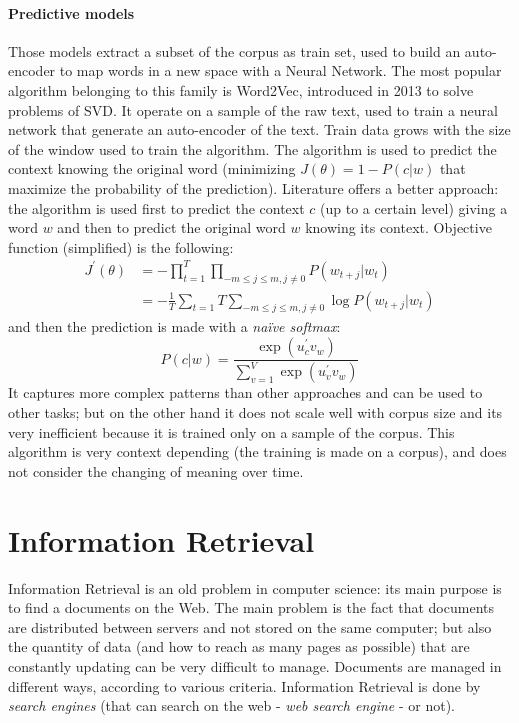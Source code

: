 \documentclass[11pt, a4page]{article}
\begin{document}
\subsection{Predictive models}
Those models extract a subset of the corpus as train set, used to build an auto-encoder to map words in a new space with a Neural Network.
The most popular algorithm belonging to this family is Word2Vec, introduced in 2013 to solve problems of SVD.
It operate on a sample of the raw text, used to train a neural network that generate an auto-encoder of the text.
Train data grows with the size of the window used to train the algorithm.
The algorithm is used to predict the context knowing the original word (minimizing $J(\theta) = 1 - P(c | w)$ that maximize the probability of the prediction).
Literature offers a better approach: the algorithm is used first to predict the context $c$ (up to a certain level) giving a word $w$ and then to predict the original word $w$ knowing its context.
Objective function (simplified) is the following:
\begin{align*}
  J^\prime(\theta) &= - \prod_{t = 1}^T \prod_{-m \le j \le m, j \ne 0} P(w_{t + j} | w_t) \\
                   &= - \frac{1}{T} \sum_{t=1}{T} \sum_{-m \le j \le m, j \ne 0}\log P(w_{t + j} | w_t)
\end{align*}
and then the prediction is made with a \textit{naïve softmax}:
\begin{equation*}
  P(c | w) = \frac{\exp(u_c^\prime v_w)}{\sum_{v = 1}^V \exp(u_v^\prime v_w)}
\end{equation*}
It captures more complex patterns than other approaches and can be used to other tasks; but on the other hand it does not scale well with corpus size and its very inefficient because it is trained only on a sample of the corpus.
This algorithm is very context depending (the training is made on a corpus), and does not consider the changing of meaning over time.
\newpage

\part{Information Retrieval}
Information Retrieval is an old problem in computer science: its main purpose is to find a documents on the Web.
The main problem is the fact that documents are distributed between servers and not stored on the same computer; but also the quantity of data (and how to reach as many pages as possible) that are constantly updating can be very difficult to manage.
Documents are managed in different ways, according to various criteria.
Information Retrieval is done by \textit{search engines} (that can search on the web - \textit{web search engine} - or not).
\end{document}
